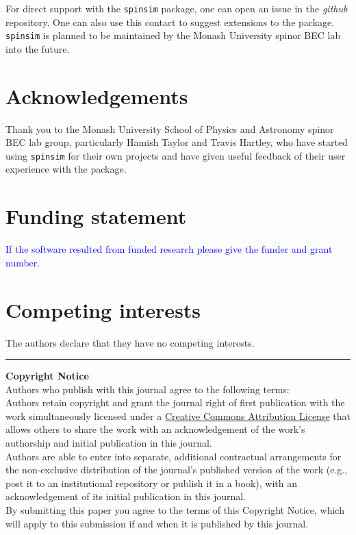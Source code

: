 \documentclass{jors}
\begin{document}
		For direct support with the \texttt{spinsim} package, one can open an issue in the \emph{github} repository. One can also use this contact to suggest extensions to the package. \texttt{spinsim} is planned to be maintained by the Monash University spinor BEC lab into the future.

\section{Acknowledgements}

Thank you to the Monash University School of Physics and Astronomy spinor BEC lab group, particularly Hamish Taylor and Travis Hartley, who have started using \texttt{spinsim} for their own projects and have given useful feedback of their user experience with the package.

\section{Funding statement}

\textcolor{blue}{If the software resulted from funded research please give the funder and grant number.}

\section{Competing interests}

The authors declare that they have no competing interests.

{}


\vspace{2cm}

\rule{\textwidth}{1pt}

{ \bf Copyright Notice} \\
Authors who publish with this journal agree to the following terms: \\

Authors retain copyright and grant the journal right of first publication with the work simultaneously licensed under a  \href{http://creativecommons.org/licenses/by/3.0/}{Creative Commons Attribution License} that allows others to share the work with an acknowledgement of the work's authorship and initial publication in this journal. \\

Authors are able to enter into separate, additional contractual arrangements for the non-exclusive distribution of the journal's published version of the work (e.g., post it to an institutional repository or publish it in a book), with an acknowledgement of its initial publication in this journal. \\

By submitting this paper you agree to the terms of this Copyright Notice, which will apply to this submission if and when it is published by this journal.
\end{document}
